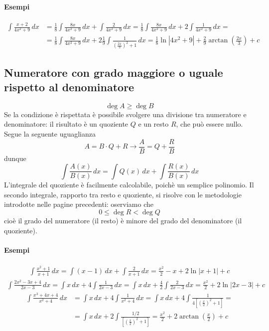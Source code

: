 \documentclass[11pt]{article}
\begin{document}
\paragraph{Esempi}
\begin{align*} \int \frac{x+2}{4x^2+9}\,dx&=\frac{1}{8}\int \frac{8x}{4x^2+9}\,dx+\int \frac{2}{4x^2+9}\,dx=\frac{1}{8} \int \frac{8x}{4x^2+9}\,dx+2\int \frac{1}{4x^2+9}\,dx=\\&=\frac{1}{8} \int \frac{8x}{4x^2+9}\,dx+2\frac{1}{9}\int \frac{1}{\left(\frac{2x}{3}\right)^2+1}\,dx=\frac{1}{8}\ln|4x^2+9|+\frac{2}{9}\arctan \left(\frac{2x}{3}\right)+c \end{align*}

\subsection{Numeratore con grado maggiore o uguale rispetto al denominatore}
\[\boxed{\deg A \geq \deg B}\]
Se la condizione è rispettata è possibile svolgere una divisione tra numeratore e denominatore: il risultato è un quoziente $Q$ e un resto $R$, che può essere nullo. Segue la seguente uguaglianza
\[\boxed{A=B \cdot Q+R \longrightarrow \frac{A}{B} = Q+ \frac{R}{B}}\]
dunque
\[\boxed{\int \frac{A(x)}{B(x)}\,dx=\int Q(x)\,dx+\int\frac{R(x)}{B(x)}\,dx}\]
L'integrale del quoziente è facilmente calcolabile, poichè un semplice polinomio. Il secondo integrale, rapporto tra resto e quoziente, si risolve con le metodologie introdotte nelle pagine precedenti: oserviamo che 
\[\boxed{0 \leq \deg R < \deg Q}\]
cioè il grado del numeratore (il resto) è minore del grado del denominatore (il quoziente). 
\paragraph{Esempi}
\begin{align*} \int \frac{x^2+1}{x+1}\,dx=\int(x-1)\,dx+\int \frac{2}{x+1}\,dx=\frac{x^2}{2}-x+2\ln|x+1|+c\end{align*}
\begin{align*}\int \frac{2x^2-3x+4}{2x-3}\,dx=\int x\,dx + 4 \int \frac{1}{2x-3}\,dx=\int x\, dx + \frac{4}{2}\int \frac{2}{2x-3}\,dx=\frac{x^2}{2}+2\ln|2x-3|+c\end{align*}
\begin{align*} \int \frac{x^3+4x+4}{x^2+4}\,dx&=\int x\,dx+4\int\frac{1}{x^2+4}\,dx=\int x\,dx+4\int \frac{1}{4\left[\left(\frac{x}{2}\right)^2+1\right]}=\\&=\int x\,dx+2\int \frac{1/2}{\left[\left(\frac{x}{2}\right)^2+1\right]}=\frac{x^2}{2}+2\arctan\left(\frac{x}{2}\right)+c\end{align*}
\end{document}
